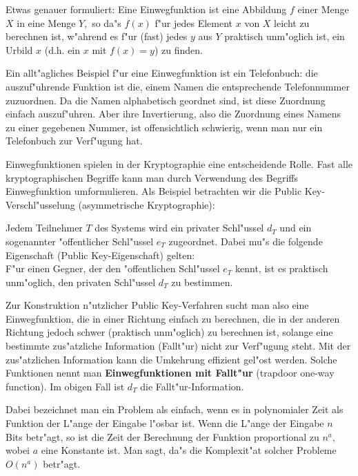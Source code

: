 Etwas genauer formuliert:  Eine Einwegfunktion ist eine Abbildung $ f $ einer Menge $ X $ in eine Menge $ Y, $ so da"s $ f(x) $ f"ur jedes Element $ x $ von $ X $ leicht zu berechnen ist, w"ahrend es f"ur (fast) jedes $ y $ aus $ Y $  praktisch unm"oglich ist, ein Urbild $ x $ (d.h. ein $ x $ mit $ f(x)=y $) zu finden.\par

Ein allt"agliches Beispiel f"ur eine Einwegfunktion ist ein Telefonbuch: die auszuf"uhrende Funktion ist die, einem Namen die entsprechende Telefonnummer zuzuordnen. Da die Namen alphabetisch geordnet sind, ist diese Zuordnung einfach auszuf"uhren. Aber ihre Invertierung, also die Zuordnung eines Namens zu einer gegebenen Nummer, ist offensichtlich schwierig, wenn man nur ein Telefonbuch zur Verf"ugung hat. \par

Einwegfunktionen spielen in der Kryptographie eine entscheidende Rolle. Fast alle kryptographischen Begriffe kann man durch Verwendung des Begriffs Einwegfunktion umformulieren. Als Beispiel betrachten wir die Public Key-Verschl"usselung  (asymmetrische Kryptographie):\par

Jedem Teilnehmer $ T $ des Systems wird ein privater   Schl"ussel $ d_T $   und ein sogenannter "offentlicher Schl"ussel $ e_T $   zugeordnet. Dabei mu"s die folgende Eigenschaft (Public Key-Eigenschaft) gelten:\\
F"ur einen Gegner, der den "offentlichen Schl"ussel $ e_T $  kennt, ist es praktisch unm"oglich, den privaten Schl"ussel  $ d_T $ zu bestimmen.\par

Zur Konstruktion n"utzlicher Public Key-Verfahren sucht man also eine Einwegfunktion, die in einer Richtung \glqq einfach\grqq {} zu berechnen, die in der anderen Richtung jedoch \glqq schwer\grqq {} (praktisch unm"oglich) zu berechnen ist, solange eine bestimmte zus"atzliche Information  (Fallt"ur) nicht zur Verf"ugung steht. Mit der zus"atzlichen Information kann die Umkehrung effizient gel"ost werden. Solche Funktionen nennt man {\bf Einwegfunktionen mit Fallt"ur} (trapdoor one-way function). Im obigen Fall ist $ d_T $ die Fallt"ur-Information. \par

Dabei bezeichnet man ein Problem als \glqq einfach\grqq, wenn es in  polynomialer Zeit als Funktion der L"ange der Eingabe l"osbar ist. Wenn die L"ange der Eingabe $ n $ Bits betr"agt, so ist die Zeit der Berechnung der Funktion proportional zu $ n^{a}, $ wobei $ a $  eine Konstante ist. Man sagt, da"s die  Komplexit"at solcher Probleme $ O(n^{a}) $ betr"agt. 


